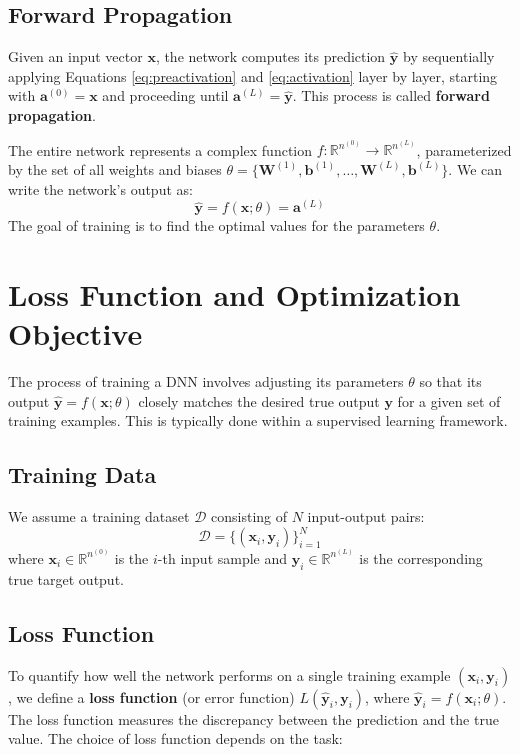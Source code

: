 \documentclass[11pt,twoside,openright]{report}
\begin{document}
\subsection{Forward Propagation}
Given an input vector $\mathbf{x}$, the network computes its prediction $\hat{\mathbf{y}}$ by sequentially applying Equations \ref{eq:preactivation} and \ref{eq:activation} layer by layer, starting with $\mathbf{a}^{(0)} = \mathbf{x}$ and proceeding until $\mathbf{a}^{(L)} = \hat{\mathbf{y}}$. This process is called \textbf{forward propagation}.

The entire network represents a complex function $f: \mathbb{R}^{n^{(0)}} \to \mathbb{R}^{n^{(L)}}$, parameterized by the set of all weights and biases $\theta = \{ \mathbf{W}^{(1)}, \mathbf{b}^{(1)}, \dots, \mathbf{W}^{(L)}, \mathbf{b}^{(L)} \}$. We can write the network's output as:
$$ \hat{\mathbf{y}} = f(\mathbf{x}; \theta) = \mathbf{a}^{(L)} $$
The goal of training is to find the optimal values for the parameters $\theta$.


\newpage

\section{Loss Function and Optimization Objective}

The process of training a DNN involves adjusting its parameters $\theta$ so that its output $\hat{\mathbf{y}} = f(\mathbf{x}; \theta)$ closely matches the desired true output $\mathbf{y}$ for a given set of training examples. This is typically done within a supervised learning framework.

\subsection{Training Data}
We assume a training dataset $\mathcal{D}$ consisting of $N$ input-output pairs:
$$ \mathcal{D} = \{ (\mathbf{x}_i, \mathbf{y}_i) \}_{i=1}^N $$
where $\mathbf{x}_i \in \mathbb{R}^{n^{(0)}}$ is the $i$-th input sample and $\mathbf{y}_i \in \mathbb{R}^{n^{(L)}}$ is the corresponding true target output.

\subsection{Loss Function}
To quantify how well the network performs on a single training example $(\mathbf{x}_i, \mathbf{y}_i)$, we define a \textbf{loss function} (or error function) $L(\hat{\mathbf{y}}_i, \mathbf{y}_i)$, where $\hat{\mathbf{y}}_i = f(\mathbf{x}_i; \theta)$. The loss function measures the discrepancy between the prediction and the true value. The choice of loss function depends on the task:
\end{document}
